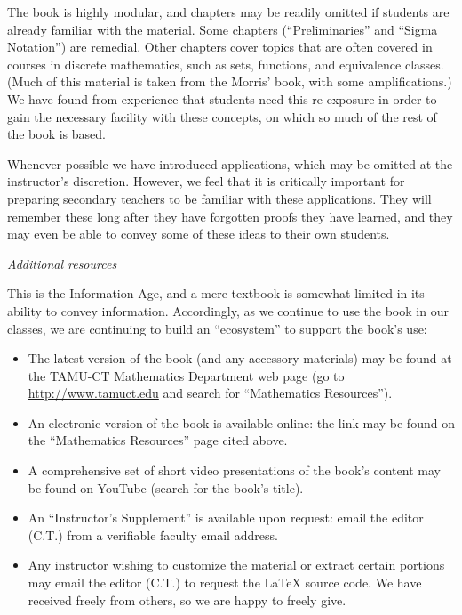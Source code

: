 The book is highly modular, and chapters may be readily omitted if students are already familiar with the material. Some chapters  (``Preliminaries'' and ``Sigma Notation'') are remedial. Other chapters cover topics that are often covered in courses in discrete mathematics, such as sets, functions, and equivalence classes. (Much of this material is taken from the Morris' book, with some amplifications.) We have found from experience that students need this re-exposure in order to gain the necessary facility with these concepts, on which so much of the rest of the book is based.

Whenever possible we have introduced applications, which may be omitted at the instructor's discretion. However, we feel that it is critically important for preparing secondary teachers to be familiar with these applications. They will remember these long after they have forgotten proofs they have learned, and they may even be able to convey some of these ideas to their own students. 

\noindent
\emph{Additional resources}
\smallskip

This is the Information Age, and a mere textbook is somewhat limited in its ability to convey information.  Accordingly, as we continue to use the book in our classes, we are continuing to build an ``ecosystem''  to support the book's use:
\begin{itemize}
\item
The latest version of the book (and any accessory materials) may be found at the TAMU-CT Mathematics Department web page (go to 
\url{http://www.tamuct.edu} and search for ``Mathematics Resources'').
\item
An electronic version of the book is available online: the link may be found on the ``Mathematics Resources'' page cited above.
\item
 A comprehensive set of short video presentations of the book's content may be found on YouTube (search for the book's title). 
\item
An ``Instructor's Supplement'' is available upon request: email the editor (C.T.) from a verifiable faculty email address.
\item
Any instructor wishing to customize the material or extract certain portions may email the editor (C.T.)  to request the LaTeX source code. We have received freely from others, so we are happy to freely give.
\end{itemize}


\medskip

